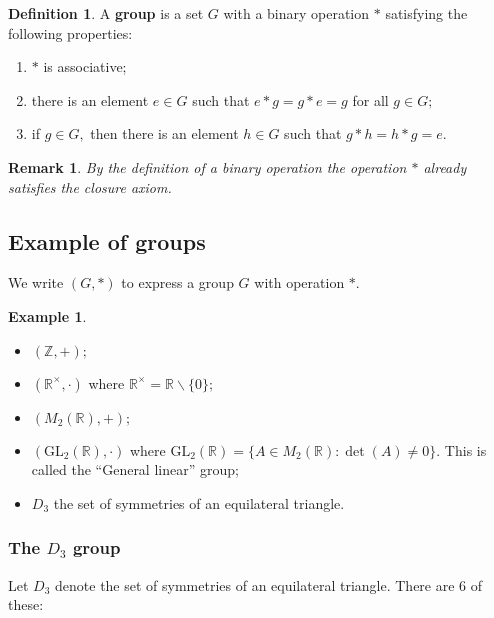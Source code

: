 \documentclass[12pt, a4paper]{article}
\newcommand{\bb}[1]{\mathbb{#1}}
\newtheorem*{remark}{Remark}
\theoremstyle{definition}
\newtheorem{definition}{Definition}[section]
\newtheorem*{example}{Example}
\theoremstyle{plain}
\begin{document}
\begin{definition}
A \textbf{group} is a set $G$ with a binary operation $*$ satisfying the following properties:
\begin{enumerate}
	
	\item $*$ is associative;

	\item there is an element $e\in G$ such that $e*g=g*e=g$ for all $g\in G;$

	\item if $g\in G,$ then there is an element $h\in G$ such that $g*h=h*g=e.$

\end{enumerate}
\end{definition}

\begin{remark}
By the definition of a binary operation the operation $*$ already satisfies the closure axiom.
\end{remark}

\subsection{Example of groups}

We write $(G,*)$ to express a group $G$ with operation $*.$

\begin{example} \hphantom{This is to make it nice}
\begin{itemize}
	\item $(\bb{Z},+);$
	\item $(\bb{R}^{\times},\cdot)$ where $\bb{R}^{\times}=\bb{R}\backslash\{0\};$
	\item $(M_2(\bb{R}),+);$
	\item $(\text{GL}_2(\bb{R}),\cdot)$ where $\text{GL}_2(\bb{R})=\{A\in M_2(\bb{R}):\det(A)\neq 0\}.$ This is called the ``General linear'' group;
	\item $D_3$ the set of symmetries of an equilateral triangle.
\end{itemize}
\end{example}

\subsubsection{The \texorpdfstring{$D_3$}{TEXT} group}

Let $D_3$ denote the set of symmetries of an equilateral triangle. There are $6$ of these:
\end{document}
